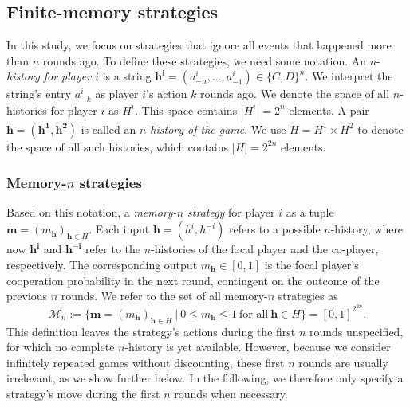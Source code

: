 \documentclass[9pt,twoside,lineno]{pnas-new}
\theoremstyle{plainCl1}
\theoremstyle{plainCl2}
\begin{document}
\subsection{Finite-memory strategies} 


In this study, we focus on strategies that ignore all events that happened more than $n$ rounds ago.
To define these strategies, we need some notation. 
An \(n\)-{\it history for player $i$} is a string \(\mathbf{h^i} \!=\! (a^i_{-n}, \ldots, a^i_{-1})\! \in \!\{C, D\}^n\). 
We interpret the string's entry \(a^i_{-k}\) as player \(i\)'s action \(k\) rounds ago. 
We denote the space of all \(n\)-histories for player \(i\) as \(H^i\). 
This space contains \(|H^i| \!=\! 2^n\) elements. 
A pair \(\mathbf{h} \!=\! (\mathbf{h^1}, \mathbf{h^2})\) is called an {\it \(n\)-history of the game}. 
We use \(H \!=\! H^1 \!\times\! H^2\) to denote the space of all such histories, which contains \(|H| \!=\! 2^{2n}\) elements.

\noindent
\subsubsection*{Memory-$n$ strategies} Based on this notation, a {\it memory-$n$ strategy}  for player $i$ as a tuple \(\mathbf{m} \!=\! (m_\mathbf{h})_{\mathbf{h}\in H}\). 
Each input $\mathbf{h}\!=\!(h^i,h^{-i})$ refers to a possible $n$-history, where now $\mathbf{h^i}$ and $\mathbf{h^{-i}}$ refer to the $n$-histories of the focal player and the co-player, respectively. 
The corresponding output $m_\mathbf{h}\!\in\![0,1]$ is the focal player's cooperation probability in the next round, contingent on  the outcome of the previous \(n\) rounds. We refer to the set of all memory-$n$ strategies as 
\begin{equation}
\mathcal{M}_n:=\Big\{ \mathbf{m}\!=\!(m_\mathbf{h})_{\mathbf{h}\in H} ~\Big|~0\!\le\!m_\mathbf{h}\!\le\!1~\text{for all}~ \mathbf{h}\!\in\! H\Big\} = [0,1]^{2^{2n}} .
\end{equation}
This definition leaves the strategy's actions during the first $n$ rounds unspecified, for which no complete $n$-history is yet available. 
However, because we consider infinitely repeated games without discounting, these first $n$ rounds are usually irrelevant, as we show further below. 
In the following, we therefore only specify a strategy's move during the first $n$ rounds when necessary. 
\end{document}
